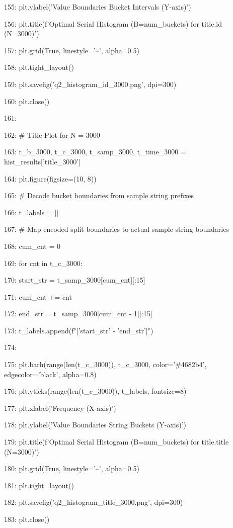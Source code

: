 \documentclass[11pt,a4paper]{article}
\begin{document}
{155:     plt.ylabel('Value Boundaries Bucket Intervals (Y-axis)')

156:     plt.title(f'Optimal Serial Histogram (B={num\_buckets}) for title.id (N=3000)')

157:     plt.grid(True, linestyle='--', alpha=0.5)

158:     plt.tight\_layout()

159:     plt.savefig('q2\_histogram\_id\_3000.png', dpi=300)

160:     plt.close()

161:

162:     \# Title Plot for N = 3000

163:     t\_b\_3000, t\_c\_3000, t\_samp\_3000, t\_time\_3000 = hist\_results['title\_3000']

164:     plt.figure(figsize=(10, 8))

165:     \# Decode bucket boundaries from sample string prefixes

166:     t\_labels = []

167:     \# Map encoded split boundaries to actual sample string boundaries

168:     cum\_cnt = 0

169:     for cnt in t\_c\_3000:

170:         start\_str = t\_samp\_3000[cum\_cnt][:15]

171:         cum\_cnt += cnt

172:         end\_str = t\_samp\_3000[cum\_cnt - 1][:15]

173:         t\_labels.append(f"['{start\_str}' - '{end\_str}']")

174:

175:     plt.barh(range(len(t\_c\_3000)), t\_c\_3000, color='\#4682b4', edgecolor='black', alpha=0.8)

176:     plt.yticks(range(len(t\_c\_3000)), t\_labels, fontsize=8)

177:     plt.xlabel('Frequency (X-axis)')

178:     plt.ylabel('Value Boundaries String Buckets (Y-axis)')

179:     plt.title(f'Optimal Serial Histogram (B={num\_buckets}) for title.title (N=3000)')

180:     plt.grid(True, linestyle='--', alpha=0.5)

181:     plt.tight\_layout()

182:     plt.savefig('q2\_histogram\_title\_3000.png', dpi=300)

183:     plt.close()

}
\end{document}
